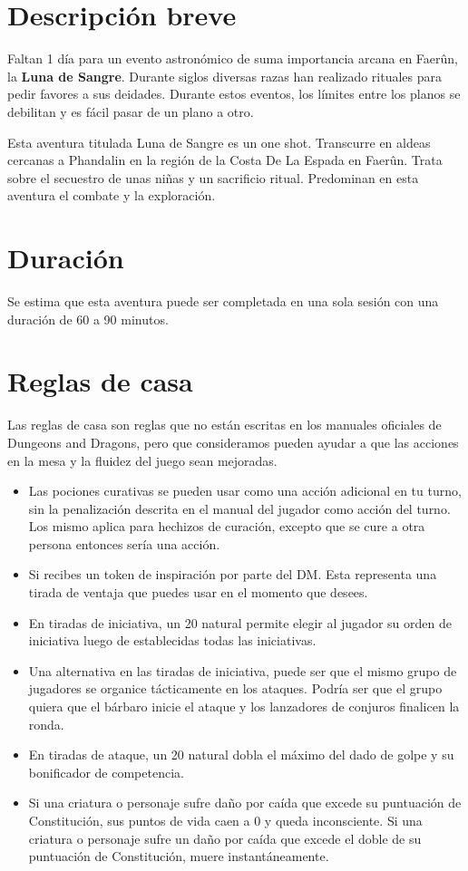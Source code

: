 \documentclass[10pt,twoside,twocolumn,openany]{dndbook}
\begin{document}
\section*{Descripción breve}

Faltan 1 día para un evento astronómico de suma importancia arcana en Faerûn, la \textbf{Luna de Sangre}. 
Durante siglos diversas razas han realizado rituales para pedir favores a sus deidades. Durante 
estos eventos, los límites entre los planos se debilitan y es fácil pasar de un plano a otro.

Esta aventura titulada Luna de Sangre es un one shot. Transcurre en aldeas cercanas a Phandalin en 
la región de la Costa De La Espada en Faerûn. Trata sobre el secuestro de unas niñas y un 
sacrificio ritual. Predominan en esta aventura el combate y la exploración.

\section*{Duración}

Se estima que esta aventura puede ser completada en una sola sesión con una duración de 60 a 90 
minutos.

\section*{Reglas de casa}

Las reglas de casa son reglas que no están escritas en los manuales oficiales de Dungeons and 
Dragons, pero que consideramos pueden ayudar a que las acciones en la mesa y la fluidez del juego 
sean mejoradas.

\begin{itemize}
  \item Las pociones curativas se pueden usar como una acción adicional en tu turno, sin la 
  penalización descrita en el manual del jugador como acción del turno. Los mismo aplica para 
  hechizos de curación, excepto que se cure a otra persona entonces sería una acción.
  \item Si recibes un token de inspiración por parte del DM. Esta representa una tirada de 
  ventaja que puedes usar en el momento que desees.
  \item En tiradas de iniciativa, un 20 natural permite elegir al jugador su orden de 
  iniciativa luego de establecidas todas las iniciativas.
  \item Una alternativa en las tiradas de iniciativa, puede ser que el mismo grupo de jugadores
  se organice tácticamente en los ataques. Podría ser que el grupo quiera que el bárbaro inicie
  el ataque y los lanzadores de conjuros finalicen la ronda.
  \item En tiradas de ataque, un 20 natural dobla el máximo del dado de golpe y su bonificador 
  de competencia.
  \item Si una criatura o personaje sufre daño por caída que excede su puntuación de Constitución, 
  sus puntos de vida caen a 0 y queda inconsciente. Si una criatura o personaje sufre un daño por 
  caída que excede el doble de su puntuación de Constitución, muere instantáneamente.
\end{itemize}
\end{document}
